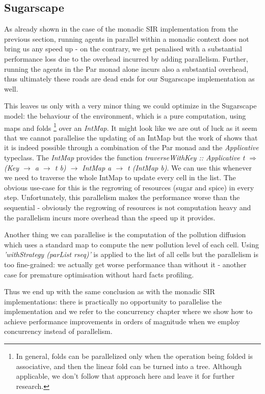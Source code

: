 \subsection{Sugarscape}
As already shown in the case of the monadic SIR implementation from the previous section, running agents in parallel within a monadic context does not bring us any speed up - on the contrary, we get penalised with a substantial performance loss due to the overhead incurred by adding parallelism. Further, running the agents in the Par monad alone incurs also a substantial overhead, thus ultimately these roads are dead ends for our Sugarscape implementation as well.

This leaves us only with a very minor thing we could optimize in the Sugarscape model: the behaviour of the environment, which is a pure computation, using maps and folds \footnote{In general, folds can be parallelized only when the operation being folded is associative, and then the linear fold can be turned into a tree. Although applicable, we don't follow that approach here and leave it for further research.} over an \textit{IntMap}. It might look like we are out of luck as it seem that we cannot parallelise the updating of an IntMap but the work of \cite{marlow_parallel_2013} shows that it is indeed possible through a combination of the Par monad and the \textit{Applicative} typeclass. The \textit{IntMap} provides the function \textit{traverseWithKey :: Applicative t $\Rightarrow$ (Key $\rightarrow$ a $\rightarrow$ t b) $\rightarrow$ IntMap a $\rightarrow$ t (IntMap b)}. We can use this whenever we need to traverse the whole IntMap to update every cell in the list. The obvious use-case for this is the regrowing of resources (sugar and spice) in every step. Unfortunately, this parallelism makes the performance worse than the sequential - obviously the regrowing of resources is not computation heavy and the parallelism incurs more overhead than the speed up it provides.

Another thing we can parallelise is the computation of the pollution diffusion which uses a standard map to compute the new pollution level of each cell. Using \textit{'withStrategy (parList rseq)'} is applied to the list of all cells but the parallelism is too fine-grained: we actually get worse performance than without it - another case for premature optimisation without hard facts profiling.

Thus we end up with the same conclusion as with the monadic SIR implementations: there is practically no opportunity to parallelise the implementation and we refer to the concurrency chapter where we show how to achieve performance improvements in orders of magnitude when we employ concurrency instead of parallelism.